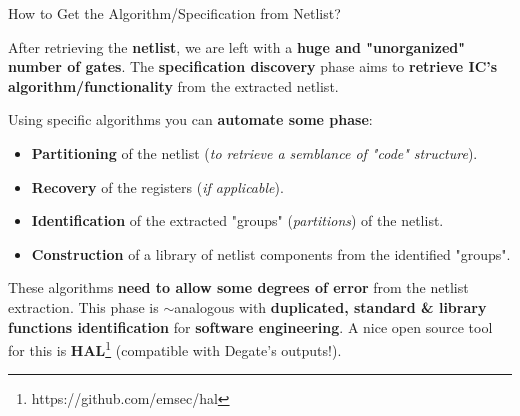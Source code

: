 \documentclass[aspectratio=169]{beamer}
\begin{document}
	\begin{frame}{How to Get the Algorithm/Specification from Netlist? \cite{LeonidAzriel2021}}
		\small
		
		After retrieving the \textbf{netlist}, we are left with a \textbf{huge and "unorganized" number of gates}. The \textbf{specification discovery} phase aims to \textbf{retrieve IC's algorithm/functionality} from the extracted netlist.
		
		\vspace{3mm}
		
		Using specific algorithms you can \textbf{automate some phase}:
		\begin{itemize}
			\item \textbf{Partitioning} of the netlist (\textit{to retrieve a semblance of "code" structure}).
			\item \textbf{Recovery} of the registers (\textit{if applicable}).
			\item \textbf{Identification} of the extracted "groups" (\textit{partitions}) of the netlist.
			\item \textbf{Construction} of a library of netlist components from the identified "groups".
		\end{itemize}
		
		\vspace{3mm}
		
		These algorithms \textbf{need to allow some degrees of error} from the netlist extraction. This phase is $\sim$analogous with \textbf{duplicated, standard \& library functions identification} for \textbf{software engineering}. A nice open source tool for this is \textbf{HAL}\footnote{https://github.com/emsec/hal} (compatible with Degate's outputs!).
	\end{frame}
	
\end{document}
